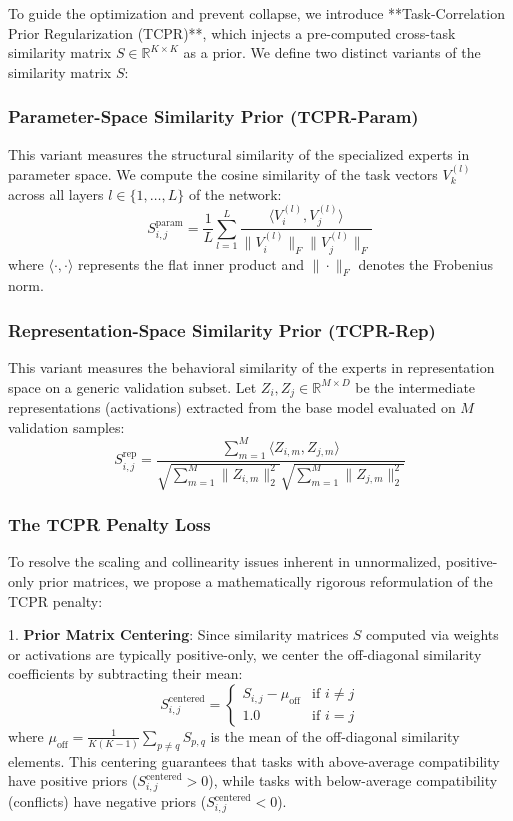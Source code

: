 To guide the optimization and prevent collapse, we introduce **Task-Correlation Prior Regularization (TCPR)**, which injects a pre-computed cross-task similarity matrix $S \in \mathbb{R}^{K \times K}$ as a prior. We define two distinct variants of the similarity matrix $S$:

\subsubsection{Parameter-Space Similarity Prior (TCPR-Param)}
This variant measures the structural similarity of the specialized experts in parameter space. We compute the cosine similarity of the task vectors $V_k^{(l)}$ across all layers $l \in \{1, \dots, L\}$ of the network:
\begin{equation}
    S^{\text{param}}_{i, j} = \frac{1}{L} \sum_{l=1}^L \frac{\langle V_i^{(l)}, V_j^{(l)} \rangle}{\|V_i^{(l)}\|_F \|V_j^{(l)}\|_F}
\end{equation}
where $\langle \cdot, \cdot \rangle$ represents the flat inner product and $\|\cdot\|_F$ denotes the Frobenius norm.

\subsubsection{Representation-Space Similarity Prior (TCPR-Rep)}
This variant measures the behavioral similarity of the experts in representation space on a generic validation subset. Let $Z_i, Z_j \in \mathbb{R}^{M \times D}$ be the intermediate representations (activations) extracted from the base model evaluated on $M$ validation samples:
\begin{equation}
    S^{\text{rep}}_{i, j} = \frac{\sum_{m=1}^M \langle Z_{i, m}, Z_{j, m} \rangle}{\sqrt{\sum_{m=1}^M \|Z_{i, m}\|^2_2} \sqrt{\sum_{m=1}^M \|Z_{j, m}\|^2_2}}
\end{equation}

\subsubsection{The TCPR Penalty Loss}
To resolve the scaling and collinearity issues inherent in unnormalized, positive-only prior matrices, we propose a mathematically rigorous reformulation of the TCPR penalty:

1. \textbf{Prior Matrix Centering}: Since similarity matrices $S$ computed via weights or activations are typically positive-only, we center the off-diagonal similarity coefficients by subtracting their mean:
\begin{equation}
    S^{\text{centered}}_{i, j} = \begin{cases}
        S_{i, j} - \mu_{\text{off}} & \text{if } i \neq j \\
        1.0 & \text{if } i = j
    \end{cases}
\end{equation}
where $\mu_{\text{off}} = \frac{1}{K(K-1)} \sum_{p \neq q} S_{p, q}$ is the mean of the off-diagonal similarity elements. This centering guarantees that tasks with above-average compatibility have positive priors ($S^{\text{centered}}_{i, j} > 0$), while tasks with below-average compatibility (conflicts) have negative priors ($S^{\text{centered}}_{i, j} < 0$).


